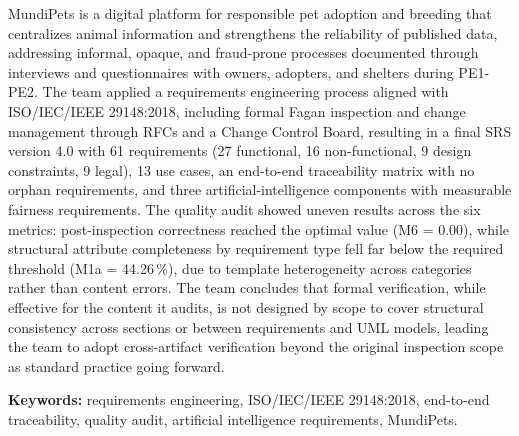 \documentclass[12pt,a4paper]{article}
\begin{document}
MundiPets is a digital platform for responsible pet adoption and breeding
that centralizes animal information and strengthens the reliability of
published data, addressing informal, opaque, and fraud-prone processes
documented through interviews and questionnaires with owners, adopters, and
shelters during PE1-PE2. The team applied a requirements engineering
process aligned with ISO/IEC/IEEE 29148:2018, including formal Fagan
inspection and change management through RFCs and a Change Control Board,
resulting in a final SRS version 4.0 with 61 requirements (27 functional,
16 non-functional, 9 design constraints, 9 legal), 13 use cases, an
end-to-end traceability matrix with no orphan requirements, and three
artificial-intelligence components with measurable fairness requirements.
The quality audit showed uneven results across the six metrics:
post-inspection correctness reached the optimal value (M6 = 0.00), while
structural attribute completeness by requirement type fell far below the
required threshold (M1a = 44.26\,\%), due to template heterogeneity across
categories rather than content errors. The team concludes that formal
verification, while effective for the content it audits, is not designed by
scope to cover structural consistency across sections or between
requirements and UML models, leading the team to adopt cross-artifact
verification beyond the original inspection scope as standard practice
going forward.

\textbf{Keywords:} requirements engineering, ISO/IEC/IEEE 29148:2018,
end-to-end traceability, quality audit, artificial intelligence
requirements, MundiPets.
\end{document}
